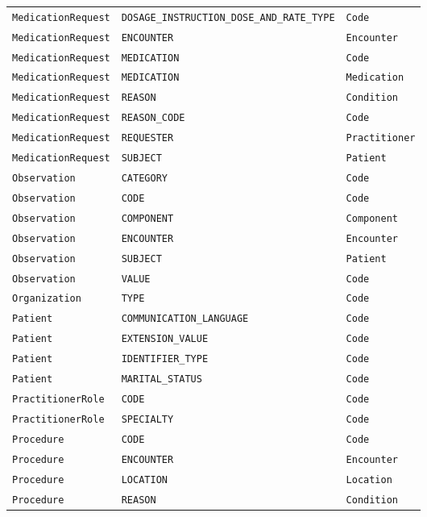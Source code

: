 \begin{longtable}{@{}p{46mm}p{52mm}p{40mm}@{}}
\texttt{MedicationRequest} & \texttt{DOSAGE\_INSTRUCTION\_DOSE\_AND\_RATE\_TYPE} & \texttt{Code} \\
\texttt{MedicationRequest} & \texttt{ENCOUNTER} & \texttt{Encounter} \\
\texttt{MedicationRequest} & \texttt{MEDICATION} & \texttt{Code} \\
\texttt{MedicationRequest} & \texttt{MEDICATION} & \texttt{Medication} \\
\texttt{MedicationRequest} & \texttt{REASON} & \texttt{Condition} \\
\texttt{MedicationRequest} & \texttt{REASON\_CODE} & \texttt{Code} \\
\texttt{MedicationRequest} & \texttt{REQUESTER} & \texttt{Practitioner} \\
\texttt{MedicationRequest} & \texttt{SUBJECT} & \texttt{Patient} \\
\texttt{Observation} & \texttt{CATEGORY} & \texttt{Code} \\
\texttt{Observation} & \texttt{CODE} & \texttt{Code} \\
\texttt{Observation} & \texttt{COMPONENT} & \texttt{Component} \\
\texttt{Observation} & \texttt{ENCOUNTER} & \texttt{Encounter} \\
\texttt{Observation} & \texttt{SUBJECT} & \texttt{Patient} \\
\texttt{Observation} & \texttt{VALUE} & \texttt{Code} \\
\texttt{Organization} & \texttt{TYPE} & \texttt{Code} \\
\texttt{Patient} & \texttt{COMMUNICATION\_LANGUAGE} & \texttt{Code} \\
\texttt{Patient} & \texttt{EXTENSION\_VALUE} & \texttt{Code} \\
\texttt{Patient} & \texttt{IDENTIFIER\_TYPE} & \texttt{Code} \\
\texttt{Patient} & \texttt{MARITAL\_STATUS} & \texttt{Code} \\
\texttt{PractitionerRole} & \texttt{CODE} & \texttt{Code} \\
\texttt{PractitionerRole} & \texttt{SPECIALTY} & \texttt{Code} \\
\texttt{Procedure} & \texttt{CODE} & \texttt{Code} \\
\texttt{Procedure} & \texttt{ENCOUNTER} & \texttt{Encounter} \\
\texttt{Procedure} & \texttt{LOCATION} & \texttt{Location} \\
\texttt{Procedure} & \texttt{REASON} & \texttt{Condition} \\

\end{longtable}
